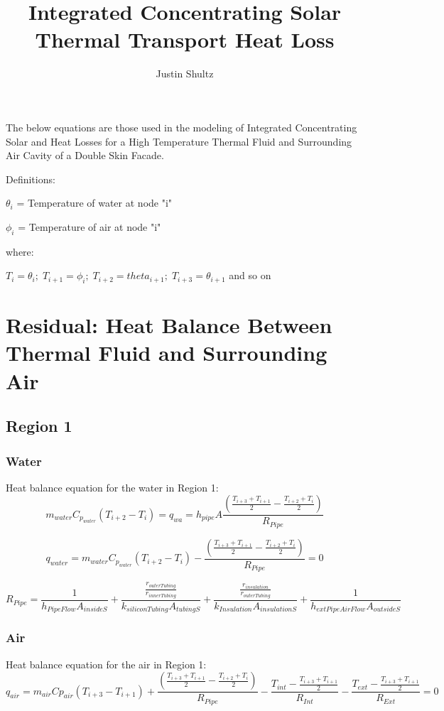 \documentclass[12pt]{report}
\author{Justin Shultz}
\title{Integrated Concentrating Solar Thermal Transport Heat Loss}
\begin{document}
The below equations are those used in the modeling of Integrated Concentrating Solar and Heat Losses for a High Temperature Thermal Fluid and Surrounding Air Cavity of a Double Skin Facade.

Definitions: 

$\theta_i$ = Temperature of water at node "i"

$\phi_i$ = Temperature of air at node "i"

where:

$ T_i = \theta_i; \; T_{i+1} = \phi_i; \; T_{i+2} = theta_{i+1}; \; T_{i+3} = \theta_{i+1}$ and so on 

\section{Residual: Heat Balance Between Thermal Fluid and Surrounding Air}

\subsection{Region 1}
\subsubsection{Water}
Heat balance equation for the water in Region 1:
$$ m_{water} C_{p_{water}} (T_{i+2}-T_i) = q_{wa} = h_{pipe} A \frac
{\left( 
	\frac{T_{i+3}+T_{i+1}}{2} - \frac{T_{i+2}+T_{i}}{2} 
	\right)}
{R_{Pipe}} $$

\begin{equation}
\boxed{q_{water} = m_{water} C_{p_{water}} (T_{i+2}-T_i) - 
		\frac
			{\left( 
				\frac{T_{i+3}+T_{i+1}}{2} - \frac{T_{i+2}+T_{i}}{2} 
			\right)}
		{R_{Pipe}}
		= 0 }
\end{equation}

$$ R_{Pipe} = 
	\frac{1}
	{h_{PipeFlow} A_{insideS}} 
	+ \frac{
		\frac{r_{outerTubing}}
		{r_{innerTubing}}
		}
		{k_{siliconTubing} A_{tubingS}} 
	+ \frac{
		\frac{r_{insulation}}
		{r_{outerTubing}}
		}
		{k_{Insulation} A_{insulationS}} 
	+ \frac{1}
	{h_{extPipeAirFlow} A_{outsideS}} $$

\subsubsection{Air}
Heat balance equation for the air in Region 1:
\begin{equation}
\boxed{q_{air} = m_{air} Cp_{air} (T_{i+3}-T_{i+1}) 
	+ \frac{
		\left( 
			\frac{T_{i+3}+T_{i+1}}{2} 
			- \frac{T_{i+2}+T_{i}}{2} 
		\right)}
		{R_{Pipe}} 
	- \frac{T_{int} - \frac{T_{i+3}+T_{i+1}}{2}}{R_{Int}}
	- \frac{T_{ext} - \frac{T_{i+3}+T_{i+1}}{2}}{R_{Ext}} = 0}
\end{equation}
	
\end{document}
